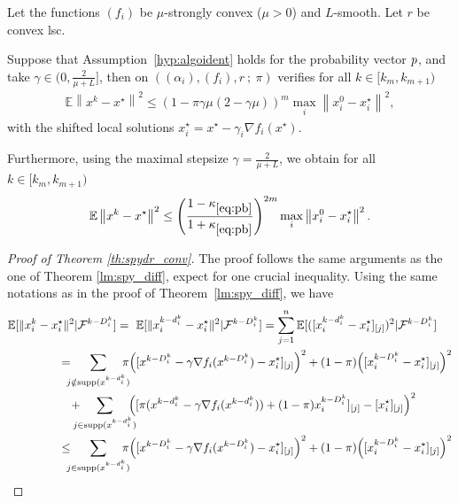 {\begin{theorem}\label{th:spydr_conv}
Let the functions $(f_i)$ be $\mu$-strongly convex ($\mu>0$) and $L$-smooth. Let $r$ be convex lsc. 

Suppose that Assumption~\ref{hyp:algoident} holds for the probability vector ${p}$, and take $\gamma \in (0, \frac{2}{\mu + L}]$,  then \salgo on $((\alpha_i),(f_i), r  ~ ; ~  \pi)$ verifies for all $k\in [k_m, k_{m+1})$
\begin{align}
\label{eq:dif_prob}
   \mathbb{E} \left\| x^k - x^\star \right\|^2 \le \left( 1 - \pi\gamma \mu(2-\gamma\mu)\right)^{m} \max_i\left\|x_i^0-x_i^\star\right\|^2,
\end{align}
with the shifted local solutions $x_i^\star = x^\star - \gamma_i\nabla f_i(x^\star)$. 

Furthermore, using the maximal stepsize $\gamma = \frac{2}{\mu + L}$, we obtain for all $k\in [k_m, k_{m+1})$
\begin{align}
\label{eq:ratebefore}
 \mathbb{E}   \left\| x^k - x^\star \right\|^2 \le \left(\frac{1-\kappa_{\eqref{eq:pb}}}{1+\kappa_{\eqref{eq:pb}}}\right)^{2m} \max_i\left\|x_i^0-x_i^\star\right\|^2.
\end{align}
\end{theorem}
\begin{proof}[Proof of Theorem \ref{th:spydr_conv}]
The proof follows the same arguments as the one of Theorem \ref{lm:spy_diff}, expect for one crucial inequality. 
Using the same notations as in the proof of Theorem~\ref{lm:spy_diff}, we have
\begin{align*}
\EE[\|x_i^k - x_i^\star\|^2&|\mathcal{F}^{k-D_i^k}]
=~ \EE[\|x_i^{k-d_i^k} - x_i^\star\|^2|\mathcal{F}^{k-D_i^k}] = \sum_{j=1}^n \EE[([x_i^{k-d_i^k} - x_i^\star]_{[j]})^2|\mathcal{F}^{k-D_i^k}] \\
=~  &\!\!\!\!\!\sum_{j\notin  \supp({{x}^{k-d_i^k}})} \!\!\!\!\!\pi\Big( [{x}^{k-D_i^k} - \gamma \nabla f_i({x}^{k-D_i^k} )  -  {x}_i^{\star}]_{[j]}\Big)^2  + (1-\pi) \Big( [x_{i}^{k-D_i^k}  -  {x}_{i}^{\star}]_{[j]} \Big)^2\\ 
    &\!\!\!+ \!\!\!\!\!\sum_{j\in \supp({{x}^{k-d_i^k}})} \!\!\!\!\!\Big( [\pi({x}^{k-d_i^k} - \gamma\nabla f_i(x^{k-d_i^k})) + (1-\pi)x^{k-D_i^k}_i]_{[j]}
     - [x_i^\star]_{[j]}\Big)^2  \\
\leq~&\!\!\!\!\!\sum_{j \in  \supp({{x}^{k-d_i^k}})} \!\!\!\!\! \pi\Big( [{x}^{k-D_i^k} - \gamma \nabla f_i({x}^{k-D_i^k} )  -  {x}_i^{\star}]_{[j]}\Big)^2 
 + (1-\pi) \Big( [x_{i}^{k-D_i^k}  -  {x}_{i}^{\star}]_{[j]} \Big)^2 \\

\end{align*}
\end{proof}}
